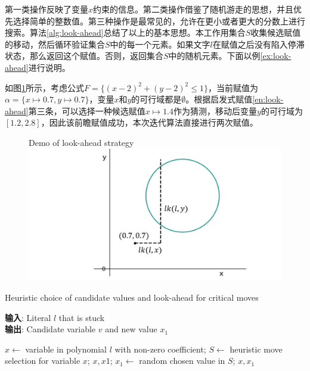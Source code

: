 第一类操作反映了变量$x$约束的信息。第二类操作借鉴了随机游走的思想，并且优先选择简单的整数值。第三种操作是最常见的，允许在更小或者更大的分数上进行搜索。算法\ref{alg:look-ahead}总结了以上的基本思想。本工作用集合$S$收集候选赋值的移动，然后循环验证集合$S$中的每一个元素。如果文字$l$在赋值之后没有陷入停滞状态，那么返回这个赋值。否则，返回集合$S$中的随机元素。下面以例\ref{ex:look-ahead}进行说明。

\begin{example}
如图\ref{fig:look-ahead}所示，考虑公式$F = \{(x - 2)^2 + (y - 2)^2 \leq 1\}$，当前赋值为$\alpha = \{x \mapsto 0.7, y \mapsto 0.7\}$，变量$x$和$y$的可行域都是$\emptyset$。根据启发式赋值\ref{en:look-ahead}第三条，可以选择一种候选赋值$x \mapsto 1.4$作为猜测，移动后变量$y$的可行域为$[1.2, 2.8]$，因此该前瞻赋值成功，本次迭代算法直接进行两次赋值。

\begin{figure}[t]
    \centering
     {Demo of look-ahead strategy}
    \includegraphics[width=0.7\columnwidth]{Img/look-ahead.png}
\label{fig:look-ahead}
\end{figure}
\label{ex:look-ahead}
\end{example}

\begin{algorithm}[t]
    \caption{Heuristic choice of candidate values and look-ahead for critical moves}
    \label{alg:look-ahead}
    \textbf{输入}: Literal $l$ that is stuck\\
    \textbf{输出}: Candidate variable $v$ and new value $x_1$
    
    \begin{algorithmic}[1] %
        \Statex \hrulefill
        \STATE $x \leftarrow$ variable in polynomial  $l$ with non-zero coefficient;
        \STATE $S \leftarrow$ heuristic move selection for variable $x$;
                \RETURN $x, x1$;
            \ENDIF
        \ENDFOR
        \STATE $x_1 \leftarrow$ random chosen value in $S$;
        \STATE \RETURN $x, x_1$
    \end{algorithmic}
\end{algorithm}


